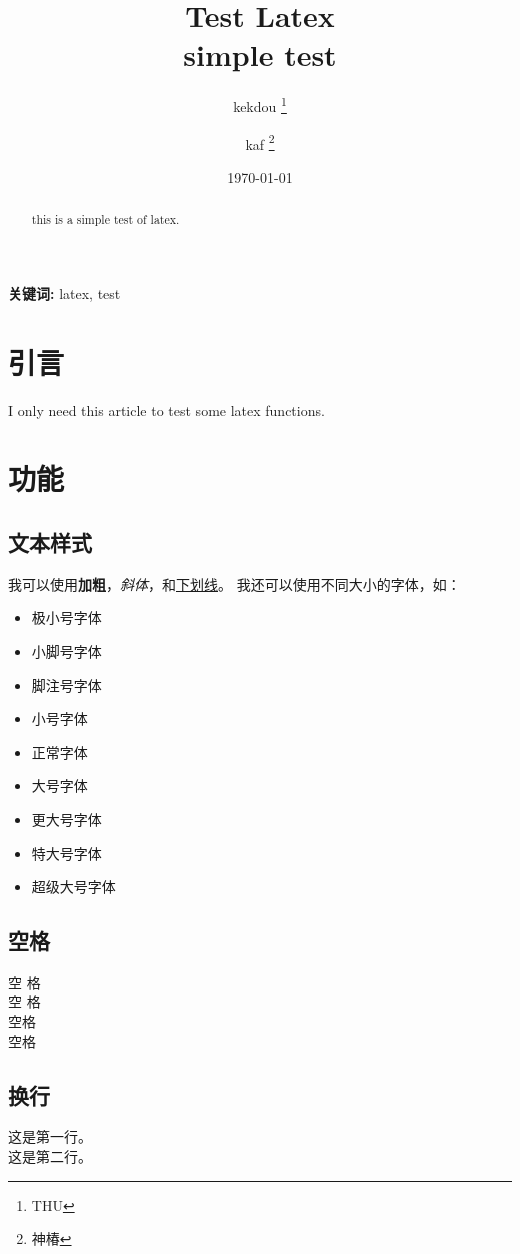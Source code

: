 \documentclass{article}
\title{Test Latex \\ \large simple test}
\author{kekdou \thanks{THU} \and
kaf \thanks{神椿}}
\date{\today}
\begin{document}
\maketitle

\begin{abstract}
this is a simple test of latex.
\end{abstract}

\noindent \textbf{关键词:} latex, test

\section{引言} \label{sec:intro}
I only need this article to test some latex functions.

\section{功能} \label{sec:functions}
\subsection{文本样式} \label{sec:textstyle}
我可以使用\textbf{加粗}，\textit{斜体}，和\underline{下划线}。
我还可以使用不同大小的字体，如：
\begin{itemize}
\item \tiny{极小号字体}
\item \scriptsize{小脚号字体}
\item \footnotesize{脚注号字体}
\item \small{小号字体}
\item \normalsize{正常字体}
\item \large{大号字体}
\item \Large{更大号字体}
\item \LARGE{特大号字体}
\item \huge{超级大号字体}
\end{itemize}

\subsection{空格} \label{sec:space}
空          格 \\
空
格 \\
空\quad 格 \\
空\qquad 格

\subsection{换行} \label{sec:newline}
这是第一行。\\
这是第二行。
\end{document}
